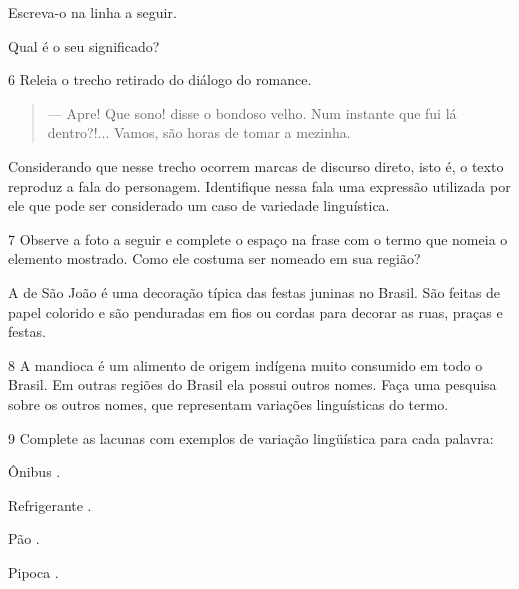 \begin{escolha}
\item Escreva-o na linha a seguir.


\item Qual é o seu significado?

\end{escolha}

\num{6} Releia o trecho retirado do diálogo do romance.

\begin{quote}
--- Apre! Que sono! disse o bondoso velho. Num instante que fui lá
dentro?!... Vamos, são horas de tomar a mezinha.
\end{quote}

Considerando que nesse trecho ocorrem marcas de discurso direto, isto é,
o texto reproduz a fala do personagem. Identifique nessa fala uma
expressão utilizada por ele que pode ser considerado um caso de
variedade linguística.



\num{7} Observe a foto a seguir e complete o espaço na frase com o termo
que nomeia o elemento mostrado. Como ele costuma ser nomeado em sua
região?


A \preencher de São João é uma decoração típica das
festas juninas no Brasil. São feitas de papel colorido e são penduradas
em fios ou cordas para decorar as ruas, praças e festas.


\num{8} A mandioca é um alimento de origem indígena muito consumido em todo
o Brasil. Em outras regiões do Brasil ela possui outros nomes. Faça uma
pesquisa sobre os outros nomes, que representam variações linguísticas
do termo.



\num{9} Complete as lacunas com exemplos de variação lingüística para cada palavra:

\begin{escolha}
\item Ônibus \preencher. 

\item Refrigerante \preencher. 

\item Pão \preencher. 

\item Pipoca \preencher. 
\end{escolha}


